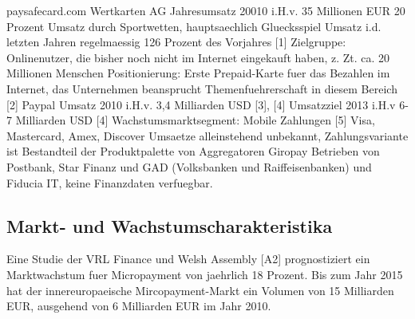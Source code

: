 paysafecard.com Wertkarten AG   \newline \newline
Jahresumsatz 20010 i.H.v. 35 Millionen EUR 
20 Prozent Umsatz durch Sportwetten, hauptsaechlich Gluecksspiel 
Umsatz i.d. letzten Jahren regelmaessig 126 Prozent des Vorjahres  [1] \newline
\newline Zielgruppe: Onlinenutzer, die bisher noch nicht im Internet eingekauft haben, z.
Zt. ca. 20 Millionen Menschen \newline \newline
Positionierung: Erste Prepaid-Karte fuer das Bezahlen im Internet, das
Unternehmen beansprucht Themenfuehrerschaft in diesem Bereich [2] \newline
\newline
Paypal  \newline \newline
Umsatz 2010 i.H.v. 3,4 Milliarden USD [3], [4]\newline
Umsatzziel 2013 i.H.v 6-7 Milliarden USD [4]\newline 
Wachstumsmarktsegment: Mobile Zahlungen [5]\newline \newline
Visa, Mastercard, Amex, Discover \newline \newline
Umsaetze alleinstehend unbekannt, Zahlungsvariante ist Bestandteil der 
Produktpalette von Aggregatoren \newline \newline
Giropay\newline \newline
Betrieben von Postbank, Star Finanz und GAD (Volksbanken und Raiffeisenbanken)
und Fiducia IT, keine Finanzdaten verfuegbar.\newline \newline

\subsection{Markt- und Wachstumscharakteristika}

Eine Studie der VRL Finance und Welsh Assembly [A2] prognostiziert ein
Marktwachstum fuer Micropayment von jaehrlich 18 Prozent. Bis zum Jahr 2015 hat 
der innereuropaeische Mircopayment-Markt ein Volumen von 15 Milliarden EUR,
ausgehend von 6 Milliarden EUR im Jahr 2010. \newline 

